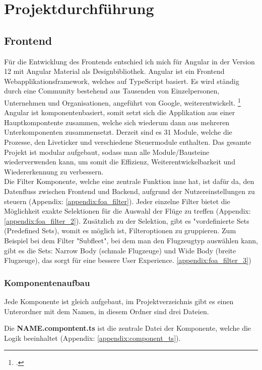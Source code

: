 \section{Projektdurchführung}

	\subsection{Frontend}
	Für die Entwicklung des Frontends entschied ich mich für Angular in der Version 12 mit Angular Material als Designbibliothek. Angular ist ein Frontend Webapplikationsframework, welches auf TypeScript basiert. Es wird ständig durch eine Community bestehend aus Tausenden von Einzelpersonen, Unternehmen und Organisationen, angeführt von Google, weiterentwickelt. \footcite{3}\\
	Angular ist komponentenbasiert, somit setzt sich die Applikation aus einer Hauptkompontente zusammen, welche sich wiederum dann aus mehreren Unterkomponenten zusammensetzt. Derzeit sind es 31 Module, welche die Prozesse, den Liveticker und verschiedene Steuermodule enthalten. Das gesamte Projekt ist modular aufgebaut, sodass man alle Module/Bausteine wiederverwenden kann, um somit die Effizienz, Weiterentwickelbarkeit und Wiedererkennung zu verbessern.\\
	Die Filter Komponente, welche eine zentrale Funktion inne hat, ist dafür da, den Datenfluss zwischen Frontend und Backend, aufgrund der Nutzereinstellungen zu steuern (Appendix: \ref{appendix:foa_filter}). Jeder einzelne Filter bietet die Möglichkeit exakte Selektionen für die Auswahl der Flüge zu treffen (Appendix: \ref{appendix:foa_filter_2}). Zusätzlich zu der Selektion, gibt es "vordefinierte Sets (Predefined Sets), womit es möglich ist, Filteroptionen zu gruppieren. Zum Beispiel bei dem Filter "Subfleet", bei dem man den Flugzeugtyp auswählen kann, gibt es die Sets: Narrow Body (schmale Flugzeuge) und Wide Body (breite Flugzeuge), das sorgt für eine bessere User Experience. \ref{appendix:foa_filter_3})

	\subsubsection{Komponentenaufbau}
	{
		\noindent
		Jede Komponente ist gleich aufgebaut, im Projektverzeichnis gibt es einen Unterordner mit dem Namen, in diesem Ordner sind drei Dateien.
	}
	\vspace{10pt}

	{
		\noindent
		Die \textbf{NAME.compontent.ts} ist die zentrale Datei der Komponente, welche die Logik beeinhaltet (Appendix: \ref{appendix:component_ts}).
	}
	\vspace{10pt}

